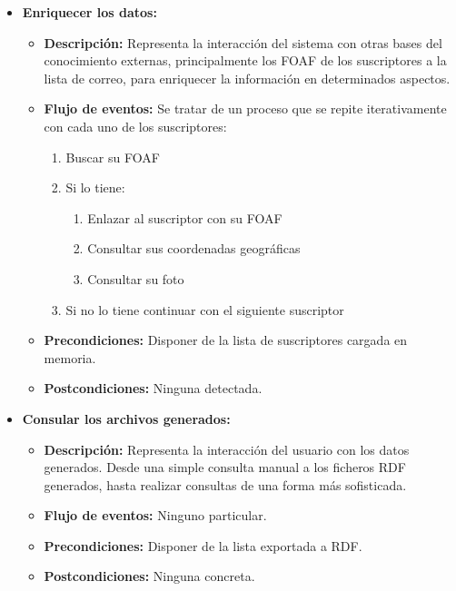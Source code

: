 \begin{itemize}
  \item \textbf{Enriquecer los datos:}
 	\begin{itemize}
 	  \item \textbf{Descripción:} Representa la interacción del 
		sistema con otras bases del conocimiento externas, 
		principalmente los FOAF de los suscriptores a la lista 
		de correo, para enriquecer la información en determinados 
		aspectos.
 	  \item \textbf{Flujo de eventos:} Se tratar de un proceso que se 
		repite iterativamente con cada uno de los suscriptores:
		\begin{enumerate}
		 \item Buscar su FOAF
		 \item Si lo tiene:
		 \begin{enumerate}
		  \item	Enlazar al suscriptor con su FOAF
		  \item Consultar sus coordenadas geográficas
		  \item Consultar su foto
		 \end{enumerate}
		 \item Si no lo tiene continuar con el siguiente suscriptor
		\end{enumerate}
	  \item \textbf{Precondiciones:} Disponer de la lista de suscriptores 
		cargada en memoria.
	  \item \textbf{Postcondiciones:} Ninguna detectada.
	\end{itemize}

  \item \textbf{Consular los archivos generados:}
 	\begin{itemize}
 	  \item \textbf{Descripción:} Representa la interacción del 
		usuario con los datos generados. Desde una simple consulta 
		manual a los ficheros RDF generados, hasta realizar consultas 
		de una forma más sofisticada.
 	  \item \textbf{Flujo de eventos:} Ninguno particular.
	  \item \textbf{Precondiciones:} Disponer de la lista exportada a RDF.
	  \item \textbf{Postcondiciones:} Ninguna concreta.
	\end{itemize}


\end{itemize}

